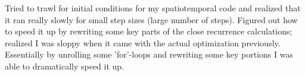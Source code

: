Tried to trawl {\statesp} for initial conditions for my spatiotemporal code and realized that
it ran really slowly for small step sizes (large number of steps). Figured out how to speed
it up by rewriting some key parts of the close recurrence calculations; realized I was sloppy
when it came with the actual optimization previously. Essentially by unrolling some 'for'-loops
and rewriting some key portions I was able to dramatically speed it up. 